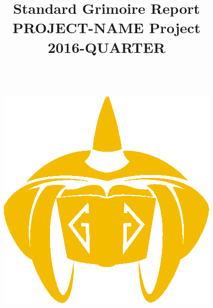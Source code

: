 \documentclass[a4wide,4pt]{article}
\begin{document}
\title{Standard Grimoire Report \\
  PROJECT-NAME Project \\
      2016-QUARTER \\
        ~~\\~~\\  \includegraphics[scale=.35]{logo}       \\}




\maketitle


\newpage
~~\\~\\~\\~\\


~~\\~~\\

~~\\
~~\\

\begin{tabular}{p{5cm}p{10cm}}

\end{tabular}
\end{document}
